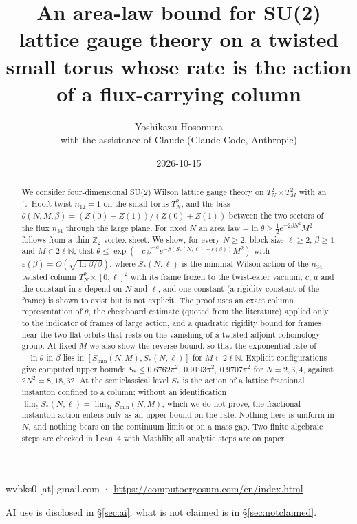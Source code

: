 \documentclass[11pt,a4paper]{article}
\title{An area-law bound for SU(2) lattice gauge theory on a twisted small torus whose rate is the action of a flux-carrying column}
\author{Yoshikazu Hosomura\\[.3em]\normalsize with the assistance of Claude (Claude Code, Anthropic)}
\date{2026-10-15}
\theoremstyle{definition}
\theoremstyle{remark}
\begin{document}
\maketitle
\begin{center}\small wvbks0 [at] gmail.com · \url{https://computoergosum.com/en/index.html}\end{center}
\begin{center}\small AI use is disclosed in \S\ref{sec:ai}; what is not claimed is in \S\ref{sec:notclaimed}.\end{center}

\begin{abstract}
We consider four-dimensional SU(2) Wilson lattice gauge theory on $T^2_N\times T^2_M$ with an 't~Hooft twist $n_{12}=1$ on the small torus $T^2_N$, and the bias $\theta(N,M,\beta)=(Z(0)-Z(1))/(Z(0)+Z(1))$ between the two sectors of the flux $n_{34}$ through the large plane.
For fixed $N$ an area law $-\ln\theta\ge\frac12 e^{-2\beta N^2}M^2$ follows from a thin $\mathbb{Z}_2$ vortex sheet.
We show, for every $N\ge2$, block size $\ell\ge2$, $\beta\ge1$ and $M\in2\ell\mathbb{N}$, that $\theta\le\exp(-c\,\beta^{-a}e^{-\beta(S_*(N,\ell)+\varepsilon(\beta))}M^2)$ with $\varepsilon(\beta)=O(\sqrt{\ln\beta/\beta})$, where $S_*(N,\ell)$ is the minimal Wilson action of the $n_{34}$-twisted column $T^2_N\times[0,\ell]^2$ with its frame frozen to the twist-eater vacuum; $c$, $a$ and the constant in $\varepsilon$ depend on $N$ and $\ell$, and one constant (a rigidity constant of the frame) is shown to exist but is not explicit.
The proof uses an exact column representation of $\theta$, the chessboard estimate (quoted from the literature) applied only to the indicator of frames of large action, and a quadratic rigidity bound for frames near the two flat orbits that rests on the vanishing of a twisted adjoint cohomology group.
At fixed $M$ we also show the reverse bound, so that the exponential rate of $-\ln\theta$ in $\beta$ lies in $[S_{\min}(N,M),S_*(N,\ell)]$ for $M\in2\ell\mathbb{N}$.
Explicit configurations give computed upper bounds $S_*\le0.6762\pi^2,\ 0.9193\pi^2,\ 0.9707\pi^2$ for $N=2,3,4$, against $2N^2=8,18,32$.
At the semiclassical level $S_*$ is the action of a lattice fractional instanton confined to a column; without an identification $\lim_\ell S_*(N,\ell)=\lim_M S_{\min}(N,M)$, which we do not prove, the fractional-instanton action enters only as an upper bound on the rate.
Nothing here is uniform in $N$, and nothing bears on the continuum limit or on a mass gap.
Two finite algebraic steps are checked in Lean~4 with Mathlib; all analytic steps are on paper.
\end{abstract}
\end{document}
